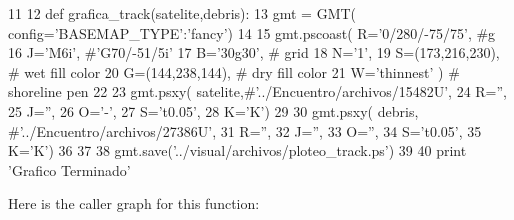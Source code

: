 \begin{DoxyCode}
11 
12 def grafica_track(satelite,debris):
13     gmt = GMT( config={'BASEMAP_TYPE':'fancy'})
14     
15     gmt.pscoast( R='0/280/-75/75', #g
16                  J='M6i', #'G70/-51/5i'
17                  B='30g30',              # grid
18                  N='1',
19                  S=(173,216,230),      # wet fill color 
20                  G=(144,238,144),      # dry fill color
21                  W='thinnest' )        # shoreline pen
22                
23     gmt.psxy( satelite,#'../Encuentro/archivos/15482U',
24               R='',
25               J='',
26               O='-',
27               S='t0.05',
28               K='K')
29                
30     gmt.psxy( debris,  #'../Encuentro/archivos/27386U',
31               R='',
32               J='',
33               O='',
34               S='t0.05',
35               K='K')
36     
37     
38     gmt.save('../visual/archivos/ploteo_track.ps')
39     
40     print 'Grafico Terminado'
\end{DoxyCode}


\-Here is the caller graph for this function\-:


